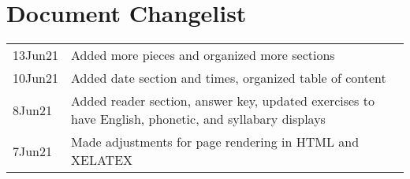 \chapter{Document Changelist}
\begin{tabular}{p{3cm} p{11cm}}
13Jun21 & Added more pieces and organized more sections \\
10Jun21 & Added date section and times, organized table of content\\
8Jun21 & Added reader section, answer key, updated exercises to have English, phonetic, and syllabary displays \\
7Jun21 & Made adjustments for page rendering in HTML and XELATEX
\end{tabular}